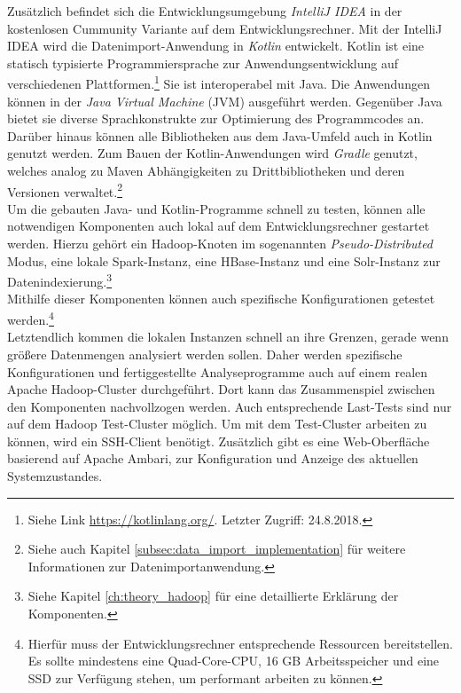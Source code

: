 \noindent
Zusätzlich befindet sich die Entwicklungsumgebung \textit{IntelliJ IDEA} in der kostenlosen Cummunity Variante  auf dem Entwicklungsrechner. Mit der IntelliJ IDEA wird die Datenimport-Anwendung in \textit{Kotlin} entwickelt. Kotlin ist eine statisch typisierte Programmiersprache zur Anwendungsentwicklung auf verschiedenen Plattformen.\footnote{Siehe Link \url{https://kotlinlang.org/}. Letzter Zugriff: 24.8.2018.} Sie ist interoperabel mit Java. Die Anwendungen können in der \textit{Java Virtual Machine} (JVM) ausgeführt werden. Gegenüber Java bietet sie diverse Sprachkonstrukte zur Optimierung des Programmcodes an. Darüber hinaus können alle Bibliotheken aus dem Java-Umfeld auch in Kotlin genutzt werden. Zum Bauen der Kotlin-Anwendungen wird \textit{Gradle} genutzt, welches analog zu Maven Abhängigkeiten zu Drittbibliotheken und deren Versionen verwaltet.\footnote{Siehe auch Kapitel \ref{subsec:data_import_implementation} für weitere Informationen zur Datenimportanwendung.}\\


\noindent
Um die gebauten Java- und Kotlin-Programme schnell zu testen, können alle notwendigen Komponenten auch lokal auf dem Entwicklungsrechner gestartet werden. Hierzu gehört ein Hadoop-Knoten im sogenannten \textit{Pseudo-Distributed} Modus, eine lokale Spark-Instanz, eine HBase-Instanz und eine Solr-Instanz zur Datenindexierung.\footnote{Siehe Kapitel \ref{ch:theory_hadoop} für eine detaillierte Erklärung der Komponenten.}\\
Mithilfe dieser Komponenten können auch spezifische Konfigurationen getestet werden.\footnote{Hierfür muss der Entwicklungsrechner entsprechende Ressourcen bereitstellen. Es sollte mindestens eine Quad-Core-CPU, 16 GB Arbeitsspeicher und eine SSD zur Verfügung stehen, um performant arbeiten zu können.} \\
Letztendlich kommen die lokalen Instanzen schnell an ihre Grenzen, gerade wenn größere Datenmengen analysiert werden sollen. Daher werden spezifische Konfigurationen und fertiggestellte Analyseprogramme auch auf einem realen
Apache Hadoop-Cluster durchgeführt. Dort kann das Zusammenspiel zwischen den Komponenten nachvollzogen werden. Auch entsprechende Last-Tests sind nur auf dem Hadoop Test-Cluster möglich. Um mit dem Test-Cluster arbeiten zu können, wird ein SSH-Client benötigt. Zusätzlich gibt es eine Web-Oberfläche basierend auf Apache Ambari, zur Konfiguration und Anzeige des aktuellen Systemzustandes.\\

